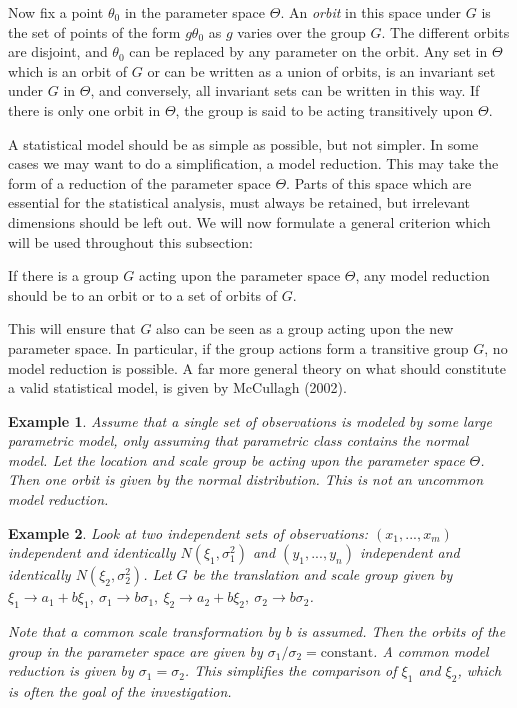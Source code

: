 \documentclass[a4paper, 11pt]{article}
\newtheorem{example}{Example}
\begin{document}
Now fix a point $\theta_0$ in the parameter space $\Theta$. An \emph{orbit} in this space under $G$ is the set of points of the form $g\theta_0 $ as $g$ varies over the group $G$. The different orbits are disjoint, and $\theta_0$ 
can be replaced by any parameter on the orbit. Any set in $\Theta$ which is an orbit of $G$ or can be written as a union of orbits, is an invariant set under $G$ in $\Theta$, and conversely, all invariant sets can be written in 
this way. If there is only one orbit in $\Theta$, the group is said to be acting transitively upon $\Theta$.

A statistical model should be as simple as possible, but not simpler. In some cases we may want to do a simplification, a model reduction. This may take the form of a reduction of the parameter space $\Theta$. Parts of this space which 
are essential for the statistical analysis, must always be retained, but irrelevant dimensions should be left out. We will now formulate a general criterion which will be used throughout this subsection:
\bigskip

\begin{principle}
  \label{principle1}
  If there is a group $G$ acting upon the parameter space $\Theta$, any model reduction should be to an orbit or to a set of orbits of $G$.
\end{principle}

This will ensure that $G$ also can be seen as a group acting upon the new parameter space. In particular, if the group actions form a transitive group $G$, no model reduction is possible. A far more general theory on what should constitute a valid statistical model, is given by McCullagh (2002).
\bigskip

\begin{example}
  Assume that a single set of observations is modeled by some large parametric model, only assuming that parametric class contains the normal model. Let the location and scale group be acting upon the parameter space $\Theta$. Then one orbit is given by the normal distribution. This is not an uncommon model reduction.
\end{example}

\smallskip

\begin{example}
  Look at two independent sets of observations: $(x_1 ,...,x_m )$ independent and identically $N(\xi_1,\sigma_1^2)$ and $(y_1 ,...,y_n )$ independent and identically $N(\xi_2 , \sigma_2 ^2)$. Let $G$ be the translation and scale group given by $\xi_1 \rightarrow a_1 +b\xi_1 ,\ \sigma_1 \rightarrow b\sigma_1 , \ \xi_2 \rightarrow a_2 +b\xi_2 ,\ \sigma_2 \rightarrow b\sigma_2 $. 

  Note that a common scale transformation by $b$ is assumed. Then the orbits of the group in the parameter space are given by $\sigma_1 /\sigma_2 =\mathrm{constant}$. A common model reduction is given by $\sigma_1 =\sigma_2 $. This simplifies the comparison of $\xi_1 $ and $\xi_2 $, which is often the goal of the investigation.
\end{example}
\end{document}
